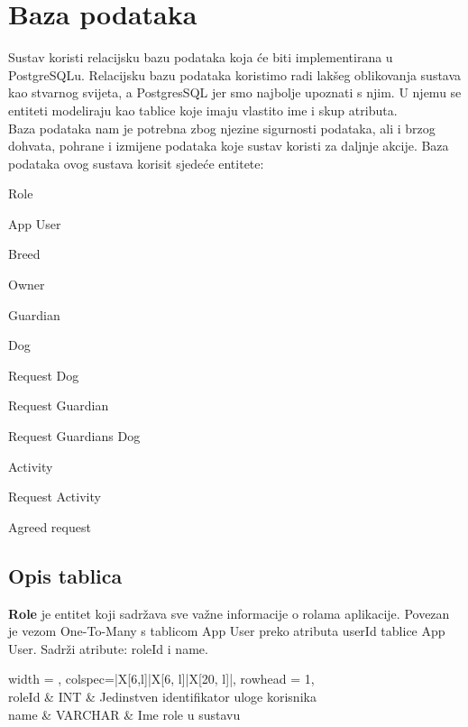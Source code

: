 		
		

	
		

		
		\eject
				
		\section{Baza podataka}
			
			Sustav koristi relacijsku bazu podataka koja će biti implementirana u PostgreSQLu. Relacijsku bazu podataka koristimo radi lakšeg oblikovanja sustava kao stvarnog svijeta, a PostgresSQL jer smo najbolje upoznati s njim. U njemu se entiteti modeliraju kao tablice koje imaju vlastito ime i skup atributa.\\
			Baza podataka nam je potrebna zbog njezine sigurnosti podataka, ali i brzog dohvata, pohrane i izmijene podataka koje sustav koristi za daljnje akcije.
			Baza podataka ovog sustava korisit sjedeće entitete:
			\begin{packed_item}
				\item Role
				\item App User
				\item Breed
				\item Owner
				\item Guardian
				\item Dog
				\item Request Dog
				\item Request Guardian
				\item Request Guardians Dog
				\item Activity
				\item Request Activity
				\item Agreed request
				
			\end{packed_item}
			
		
			\subsection{Opis tablica}
			
			
			\textbf{Role} je entitet koji sadržava sve važne informacije o rolama aplikacije. Povezan je vezom One-To-Many s tablicom App User preko atributa userId tablice App User. Sadrži atribute: roleId i name.
			
			
			
			
			\begin{longtblr}[
				label=none,
				entry=none
				]{
					width = \textwidth,
					colspec={|X[6,l]|X[6, l]|X[20, l]|}, 
					rowhead = 1,
				} %
				\hline {}	 \\ \hline[3pt]
				roleId	& INT &  Jedinstven identifikator uloge korisnika 	\\ \hline
				name & VARCHAR &  Ime role u sustavu \\ \hline
			 
			\end{longtblr}
			
